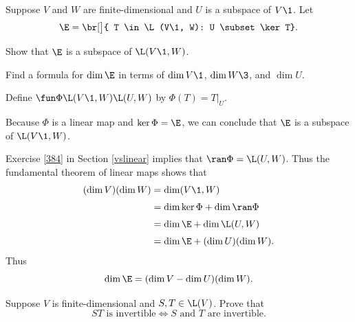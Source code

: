 \exercise
Suppose $V$ and $W$ are finite-dimensional and $U$ is a subspace of $V\1$. Let
\[ \addtolength{\belowdisplayskip}{-3bp}
\E = \br[\big]{ T \in \L(V\1, W): U \subset \ker T}.
\]
\begin{subtheorem}
\item
Show that $\E$ is a subspace of $\L(V\1, W)$.
\item
Find a formula for $\dim \E$ in terms of $\dim V\1$, $\dim W\3$, and $\dim U$.
\end{subtheorem}

\begin{Solution}
Define $\fun \Phi {\L(V\1, W)} {\L(U,W)}$ by $\Phi(T) = T|_U$.
\begin{subtheorem}
\item
Because $\Phi$ is a linear map and $\ker \Phi = \E$, we can conclude that $\E$ is a subspace of $\L(V\1, W)$.
\item
Exercise \ref{384} in Section \ref{vslinear} implies that $\ran \Phi = \L(U, W)$. Thus the fundamental theorem of linear maps shows that
\begin{align*}
(\dim V)(\dim W) &= \dim(V\1, W) \\[3bp]
&= \dim \ker \Phi + \dim \ran \Phi \\[3bp]
&= \dim \E + \dim \L(U, W) \\[3bp]
&= \dim \E+ (\dim U)(\dim W).
\end{align*}
Thus
\[
\dim \E = (\dim V - \dim U)(\dim W).
\]
\end{subtheorem}
\end{Solution}

\exercise
Suppose $V$ is finite-dimensional and $S, T \in \L(V)$.  Prove that \label{379}
\[
ST \text{ is invertible} \iff S \text{ and } T \text{ are invertible}.
\]
\exercisedisplayend

